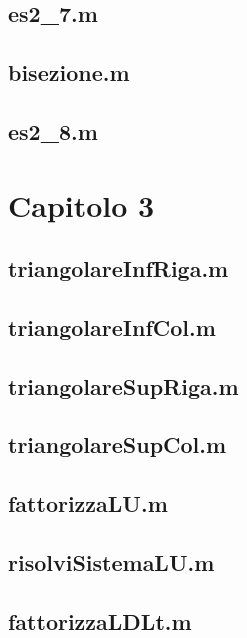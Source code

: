 		\subsection*{es2\_7.m} 
		\subsection*{bisezione.m} 
		\subsection*{es2\_8.m} 
	\section*{Capitolo 3}
		\subsection*{triangolareInfRiga.m} 
		\subsection*{triangolareInfCol.m} 
		\subsection*{triangolareSupRiga.m} 
		\subsection*{triangolareSupCol.m} 
		\subsection*{fattorizzaLU.m} 
		\subsection*{risolviSistemaLU.m} 
		\subsection*{fattorizzaLDLt.m} 
